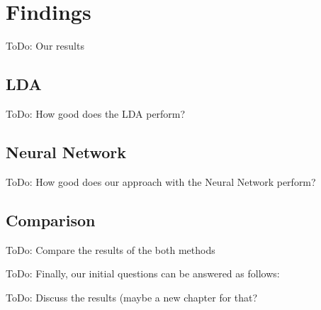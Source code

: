 \section{Findings} %
\label{sec:findings}

\colorbox{yellow!30}{ToDo:} Our results

\subsection{LDA} %
\label{sub:findings_lda}

\colorbox{yellow!30}{ToDo:} How good does the LDA perform?

\subsection{Neural Network} %
\label{sub:findings_nn}

\colorbox{yellow!30}{ToDo:} How good does our approach with the Neural Network perform?

\subsection{Comparison} %
\label{sub:findings_comparison}

\colorbox{yellow!30}{ToDo:} Compare the results of the both methods


\colorbox{yellow!30}{ToDo:} Finally, our initial questions can be answered as follows:

\colorbox{yellow!30}{ToDo:} Discuss the results (maybe a new chapter for that?

